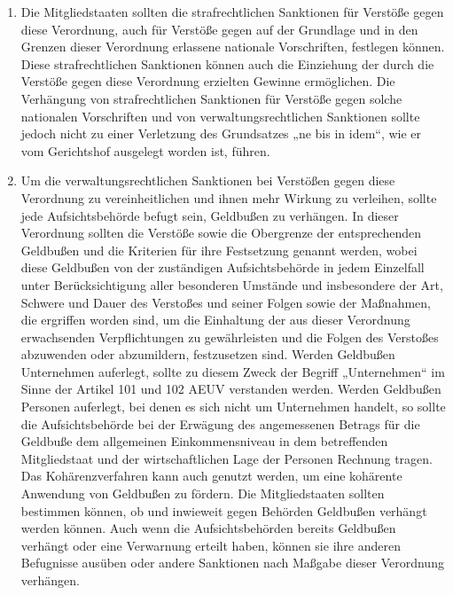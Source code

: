\begin{enumerate}
   \item Die Mitgliedstaaten sollten die strafrechtlichen Sanktionen für Verstöße gegen diese Verordnung, auch für
    Verstöße gegen auf der Grundlage und in den Grenzen dieser Verordnung erlassene nationale Vorschriften, festlegen
    können. Diese strafrechtlichen Sanktionen können auch die Einziehung der durch die Verstöße gegen diese Verordnung
    erzielten Gewinne ermöglichen. Die Verhängung von strafrechtlichen Sanktionen für Verstöße gegen solche nationalen
    Vorschriften und von verwaltungsrechtlichen Sanktionen sollte jedoch nicht zu einer Verletzung des Grundsatzes „ne
    bis in idem“, wie er vom Gerichtshof ausgelegt worden ist, führen.%
   \label{eg:149}
   

   \item Um die verwaltungsrechtlichen Sanktionen bei Verstößen gegen diese Verordnung zu vereinheitlichen und ihnen
    mehr Wirkung zu verleihen, sollte jede Aufsichtsbehörde befugt sein, Geldbußen zu verhängen. In dieser Verordnung
    sollten die Verstöße sowie die Obergrenze der entsprechenden Geldbußen und die Kriterien für ihre Festsetzung
    genannt werden, wobei diese Geldbußen von der zuständigen Aufsichtsbehörde in jedem Einzelfall unter
    Berücksichtigung aller besonderen Umstände und insbesondere der Art, Schwere und Dauer des Verstoßes und seiner
    Folgen sowie der Maßnahmen, die ergriffen worden sind, um die Einhaltung der aus dieser Verordnung erwachsenden
    Verpflichtungen zu gewährleisten und die Folgen des Verstoßes abzuwenden oder abzumildern, festzusetzen sind.
    Werden Geldbußen Unternehmen auferlegt, sollte zu diesem Zweck der Begriff „Unternehmen“ im Sinne der Artikel 101
    und 102 AEUV verstanden werden. Werden Geldbußen Personen auferlegt, bei denen es sich nicht um Unternehmen
    handelt, so sollte die Aufsichtsbehörde bei der Erwägung des angemessenen Betrags für die Geldbuße dem allgemeinen
    Einkommensniveau in dem betreffenden Mitgliedstaat und der wirtschaftlichen Lage der Personen Rechnung tragen. Das
    Kohärenzverfahren kann auch genutzt werden, um eine kohärente Anwendung von Geldbußen zu fördern. Die
    Mitgliedstaaten sollten bestimmen können, ob und inwieweit gegen Behörden Geldbußen verhängt werden können. Auch
    wenn die Aufsichtsbehörden bereits Geldbußen verhängt oder eine Verwarnung erteilt haben, können sie ihre anderen
    Befugnisse ausüben oder andere Sanktionen nach Maßgabe dieser Verordnung verhängen.%
   \label{eg:150}
   

\end{enumerate}
